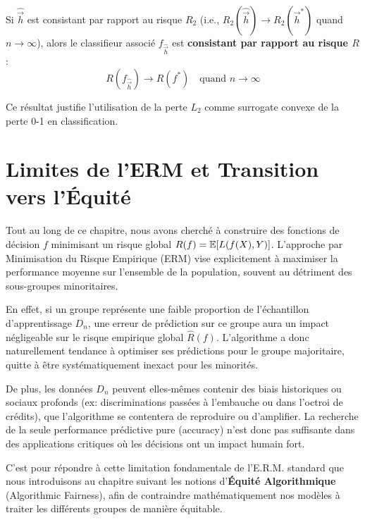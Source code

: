 \begin{corollaire}
Si $\hat{\vec{h}}$ est consistant par rapport au risque $R_2$ (i.e., $R_2(\hat{\vec{h}}) \to R_2(\vec{h}^*)$ quand $n \to \infty$), alors le classifieur associé $f_{\hat{\vec{h}}}$ est \textbf{consistant par rapport au risque $R$} :
\[
R(f_{\hat{\vec{h}}}) \to R(f^*) \quad \text{quand } n \to \infty
\]
\end{corollaire}

Ce résultat justifie l'utilisation de la perte $L_2$ comme surrogate convexe de la perte 0-1 en classification.

\section{Limites de l'ERM et Transition vers l'Équité}

Tout au long de ce chapitre, nous avons cherché à construire des fonctions de décision $f$ minimisant un risque global $R(f) = \mathbb{E}[L(f(X),Y)]$. L'approche par Minimisation du Risque Empirique (ERM) vise explicitement à maximiser la performance moyenne sur l'ensemble de la population, souvent au détriment des sous-groupes minoritaires. 

En effet, si un groupe représente une faible proportion de l'échantillon d'apprentissage $D_n$, une erreur de prédiction sur ce groupe aura un impact négligeable sur le risque empirique global $\hat{R}(f)$. L'algorithme a donc naturellement tendance à optimiser ses prédictions pour le groupe majoritaire, quitte à être systématiquement inexact pour les minorités. 

De plus, les données $D_n$ peuvent elles-mêmes contenir des biais historiques ou sociaux profonds (ex: discriminations passées à l'embauche ou dans l'octroi de crédits), que l'algorithme se contentera de reproduire ou d'amplifier. La recherche de la seule performance prédictive pure (accuracy) n'est donc pas suffisante dans des applications critiques où les décisions ont un impact humain fort. 

C'est pour répondre à cette limitation fondamentale de l'E.R.M. standard que nous introduisons au chapitre suivant les notions d'\textbf{Équité Algorithmique} (Algorithmic Fairness), afin de contraindre mathématiquement nos modèles à traiter les différents groupes de manière équitable.
